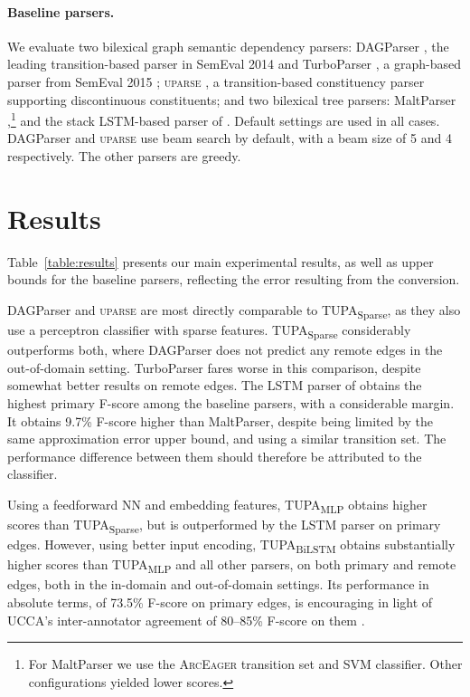 \documentclass[11pt,a4paper]{article}
\newcommand{\parser}[1]{TUPA\textsubscript{#1}}
\newcommand{\tabref}[1]{Table~\ref{#1}}
\begin{document}
\paragraph{Baseline parsers.}
We evaluate two bilexical graph semantic dependency parsers:
DAGParser \cite{ribeyre-villemontedelaclergerie-seddah:2014:SemEval}, the leading 
transition-based parser in SemEval 2014 \cite{oepen2014semeval} and
TurboParser \cite{almeida-martins:2015:SemEval},
a graph-based parser from SemEval 2015 
\cite{oepen2015semeval};
\textsc{uparse} \cite{maier-lichte:2016:DiscoNLP},
a transition-based constituency parser supporting discontinuous constituents;
and two bilexical tree parsers:
MaltParser \cite{nivre2007maltparser},\footnote{For
MaltParser we use the \textsc{ArcEager} transition set and SVM classifier.
Other configurations yielded lower scores.}
and the stack LSTM-based parser of
\citet[henceforce ``LSTM Parser'']{dyer2015transition}.
Default settings are used in all cases.
DAGParser and \textsc{uparse} use beam search by default, with a beam size of 5 and 4
respectively. The other parsers are greedy.



\section{Results}\label{sec:results}

\tabref{table:results} presents our main experimental results, as well as
upper bounds for the baseline parsers,
reflecting the error resulting from the conversion.

DAGParser and \textsc{uparse} are most directly comparable to
\parser{Sparse}, as they also use a perceptron classifier with sparse features.
\parser{Sparse} considerably outperforms both, where
DAGParser does not predict any remote edges in the out-of-domain setting.
TurboParser fares worse in this comparison, despite somewhat better results on
remote edges.
The LSTM parser of \citet{dyer2015transition} obtains the highest primary F-score
among the baseline parsers, with a considerable margin.
It obtains 9.7\% F-score higher than MaltParser,
despite being limited by the same approximation error upper bound,
and using a similar transition set.
The performance difference between them should therefore be attributed to the classifier.

Using a feedforward NN and embedding features,
\parser{MLP} obtains higher scores than \parser{Sparse},
but is outperformed by the LSTM parser on primary edges.
However, using better input encoding,
\parser{BiLSTM} obtains substantially higher scores than \parser{MLP}
and all other parsers, on both primary and remote edges,
both in the in-domain and out-of-domain settings.
Its performance in absolute terms, of 73.5\% F-score on primary edges,
is encouraging in light of
UCCA's inter-annotator agreement of 80--85\%
F-score on them \cite{abend2013universal}.
\end{document}
